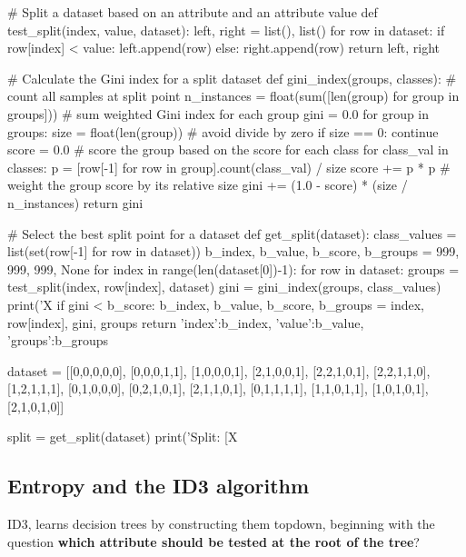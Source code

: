 \documentclass[%
oneside,                 %
final,                   %
10pt]{article}
\begin{document}
\bpycod
# Split a dataset based on an attribute and an attribute value
def test_split(index, value, dataset):
	left, right = list(), list()
	for row in dataset:
		if row[index] < value:
			left.append(row)
		else:
			right.append(row)
	return left, right
 
# Calculate the Gini index for a split dataset
def gini_index(groups, classes):
	# count all samples at split point
	n_instances = float(sum([len(group) for group in groups]))
	# sum weighted Gini index for each group
	gini = 0.0
	for group in groups:
		size = float(len(group))
		# avoid divide by zero
		if size == 0:
			continue
		score = 0.0
		# score the group based on the score for each class
		for class_val in classes:
			p = [row[-1] for row in group].count(class_val) / size
			score += p * p
		# weight the group score by its relative size
		gini += (1.0 - score) * (size / n_instances)
	return gini

# Select the best split point for a dataset
def get_split(dataset):
	class_values = list(set(row[-1] for row in dataset))
	b_index, b_value, b_score, b_groups = 999, 999, 999, None
	for index in range(len(dataset[0])-1):
		for row in dataset:
			groups = test_split(index, row[index], dataset)
			gini = gini_index(groups, class_values)
			print('X%
			if gini < b_score:
				b_index, b_value, b_score, b_groups = index, row[index], gini, groups
	return {'index':b_index, 'value':b_value, 'groups':b_groups}
 
dataset = [[0,0,0,0,0],
            [0,0,0,1,1],
            [1,0,0,0,1],
            [2,1,0,0,1],
            [2,2,1,0,1],
            [2,2,1,1,0],
            [1,2,1,1,1],
            [0,1,0,0,0],
            [0,2,1,0,1],
            [2,1,1,0,1],
            [0,1,1,1,1],
            [1,1,0,1,1],
            [1,0,1,0,1],
            [2,1,0,1,0]]

split = get_split(dataset)
print('Split: [X%
\epycod

\subsection{Entropy and the ID3 algorithm}

ID3, learns decision trees by constructing
them topdown, beginning with the question \textbf{which attribute should be tested at the root of the tree}?
\end{document}

